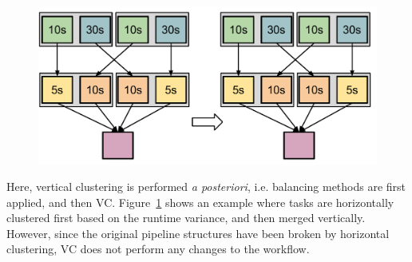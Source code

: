 \begin{figure}[!htb]
	\centering
	\includegraphics[width=0.85\linewidth]{figures/imbalance/vertical_clustering_posterior3.pdf}
	\label{fig:imbalance_vc_posterior}
\end{figure}

Here, vertical clustering is performed \emph{a posteriori}, i.e. balancing methods are first applied, and then VC. Figure~\ref{fig:imbalance_vc_posterior} shows an example where tasks are horizontally clustered first based on the runtime variance, and then merged vertically. However, since the original pipeline structures have been broken by horizontal clustering, VC does not perform any changes to the workflow. 









